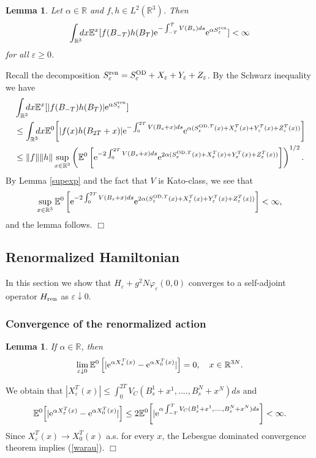 \documentclass[11pt]{article}
\newtheorem{lemma}[theorem]{Lemma}
\newcommand{\bl}[1]{\begin{lemma}\label{#1}}
\newcommand{\el}{\end{lemma}}
\providecommand{\idx}{\int_{\BR} \!\!\! dx}
\newcommand{\Ebb}{{\mathbb E}}
\providecommand{\eq}[1]{\begin{equation}\label{#1}}
\providecommand{\en}{\end{equation}}
\renewcommand{\d}{\displaystyle}
\providecommand{\qed}{\hfill {$\Box$}\par\medskip}
\providecommand{\BR}{{\mathbb{R}^3 }}
\providecommand{\od}{{\rm OD}}
\providecommand{\RR}{\mathbb{R}}
\providecommand{\kak}[1]{(\ref{#1})}
\providecommand{\LR}{{L^2(\BR)}}
\providecommand{\lk}{\left(}
\providecommand{\rk}{\right)}
\providecommand{\han}{{1/2}}
\providecommand{\non}{\nonumber}
\providecommand{\e}{{\rm e}}
\providecommand{\1}{\mathbb{1}}
\providecommand{\eps}{\varepsilon}
\providecommand{\ren}{{\rm ren}}
\begin{document}
\begin{lemma}
\label{prop:exp-int}
Let $\alpha\in\RR$ and  $f,h\in\LR$. Then
$$
\d \idx \Ebb^x[f(B_{-T}) h(B_{T}) \e^{-\int_{-T}^TV(B_s) ds}
\e^{\alpha S_\eps^\ren }]<\infty
$$
for all $\eps\geq0$.
\end{lemma}
\proof
Recall the decomposition $S_\eps^\ren  = S_\eps^{\od}+X_\eps+Y_\eps + Z_\eps$. By the Schwarz
inequality we have
\begin{align}
&
\idx \Ebb^x[|f(B_{-T}) h(B_T)| \e^{\alpha S_\eps^\ren }]\non\\
&\leq
\idx  \Ebb^0\!\left[|f(x) h(B_{2T}+x)|\e^{-\int_0^{2T}V(B_s+x) ds}
\e^{\alpha(
S_\eps^{\od, T}(x)+X_\eps^T(x)+Y_\eps^T(x)+Z_\eps^T(x))
} \right]\non\\
&\label{tosan}
\leq \|f\| \|h \| \sup_{x\in\BR} 
\lk
\Ebb^0
\left[\e^{-2\int_0^{2T}V(B_s+x) ds} \e^{2\alpha(
S_\eps^{\od, T}(x)+X_\eps^T(x)+Y_\eps^T(x)+Z_\eps^T(x))}
\right]\rk^\han.
\end{align}
By Lemma \ref{supexp} and the fact that $V$ is Kato-class, we see that
$$
\sup_{x\in\BR} \Ebb^0\left[\e^{-2\int_0^{2T}V(B_s+x) ds} \e^{
2\alpha(
S_\eps^{\od, T}(x)+
X_\eps^T(x)+Y_\eps^T(x)+Z_\eps^T(x))}\right]<\infty,
$$
and the lemma follows.
\qed


\subsection{Renormalized Hamiltonian}
In this section we show that $H_\eps+g^2 N \varphi_\eps(0,0)$ converges to  a self-adjoint operator
$H_{\ren}$ as $\eps\downarrow 0$.

\subsubsection{Convergence of the renormalized action}
\label{222}
\bl{convexp}
If $\alpha\in\RR$, then
\eq{warau}
\lim_{\eps\downarrow 0}\Ebb^0 \left[|\e^{\alpha X_\eps^T(x)}-\e^{\alpha X_0^T(x)}|\right]=0,\quad
x\in\RR^{3N}.
\en
\el
\proof
We obtain that
$|X_\eps^T(x)|\leq \int_{0}^{2T} V_C(B_s^1+x^1,....,B_s^N+x^N)ds$ and
$$
\Ebb^0\!\left[|\e^{\alpha X_\eps^T(x)}-\e^{\alpha X_0^T(x)}|\right]
\leq
2 \Ebb^0\!\left[|\e^{\alpha \int_{-T}^T V_C(B_s^1+x^1,....,B_s^N+x^N)ds}\right]<\infty.
$$
Since $X_\eps^T(x)\to X_0^T(x)$ a.s. for every $x$,  the Lebesgue dominated convergence theorem implies
\kak{warau}.
\qed
\end{document}
